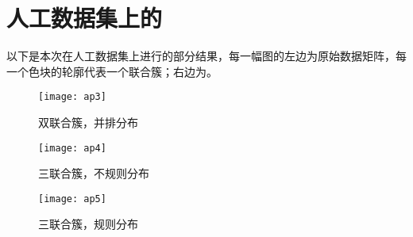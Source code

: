 \chapter{人工数据集上的}
以下是本次在人工数据集上进行的部分结果，每一幅图的左边为原始数据矩阵，每一个色块的轮廓代表一个联合簇；右边为。
\vspace{4mm}
\newpage
\begin{figure}
\centering
\texttt{[image: ap3]}
\caption {双联合簇，并排分布}
\label{fig:idea}
\end{figure}

\begin{figure}
\centering
\texttt{[image: ap4]}
\caption {三联合簇，不规则分布}
\label{fig:idea}
\end{figure}

\begin{figure}
\centering
\texttt{[image: ap5]}
\caption {三联合簇，规则分布}
\label{fig:idea}
\end{figure}

